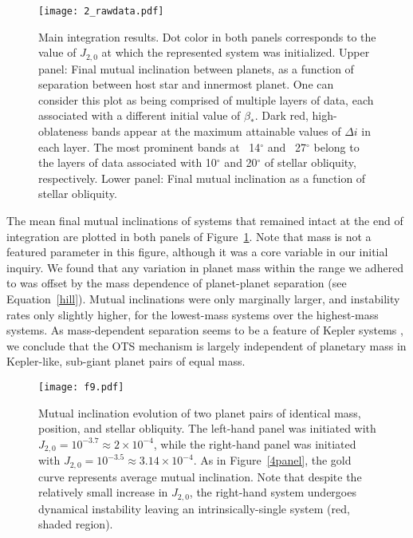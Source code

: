 \documentclass[twocolumn]{aastex63}
\begin{document}
\begin{figure}
\centering
\texttt{[image: 2\_rawdata.pdf]}
\caption{Main integration results. Dot color in both panels corresponds to the value of \(J_{2,0} \) at which the represented system was initialized. Upper panel: Final mutual inclination between planets, as a function of separation between host star and innermost planet. One can consider this plot as being comprised of multiple %
layers of data, each associated with a different initial value of \(\beta_*\).
Dark red, high-oblateness bands appear at the maximum attainable values of \(\Delta i\) in each layer. The most prominent bands at ~14$^{\circ}$ and ~27$^{\circ}$ belong to the layers of data associated with 10$^{\circ}$ and 20$^{\circ}$ of stellar obliquity, respectively. Lower panel: Final mutual inclination as a function of stellar obliquity.}\label{rawdata}
\end{figure}

The mean final mutual inclinations of systems that remained intact at the end of integration are plotted in both panels of Figure~\ref{rawdata}. Note that mass is not a featured parameter in this figure, although it was a core variable in our initial inquiry. We found that any variation in planet mass within the range we adhered to was offset by the mass dependence of planet-planet separation (see Equation~\ref{hill}). Mutual inclinations were only marginally larger, and instability rates only slightly higher, for the lowest-mass systems over the highest-mass systems. As mass-dependent separation seems to be a feature of Kepler systems \citep{weiss2018california}, we conclude that the OTS mechanism is largely independent of planetary mass in Kepler-like, sub-giant planet pairs of equal mass.
\begin{figure}
\centering
\texttt{[image: f9.pdf]}
\caption{Mutual inclination evolution of two planet pairs of identical mass, position, and stellar obliquity. The left-hand panel was initiated with \(J_{2,0}=10^{-3.7}\approx 2\times10^{-4}\), while the right-hand panel was initiated with \(J_{2,0}=10^{-3.5}\approx3.14\times10^{-4}\). As in Figure~\ref{4panel}, the gold curve represents average mutual inclination. Note that despite the relatively small increase in $J_{2,0}$, the right-hand system undergoes dynamical instability leaving an intrinsically-single system (red, shaded region). }\label{st_vs_unst}
\end{figure}
\end{document}
